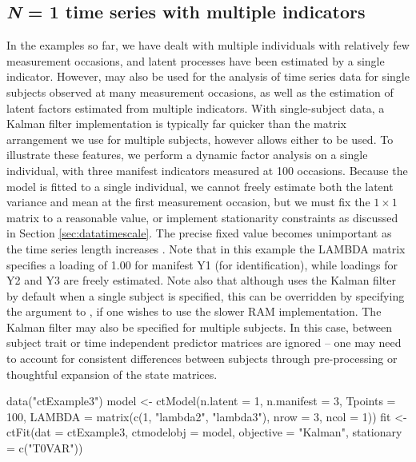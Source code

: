 \documentclass[nojss]{jss}\usepackage[]{graphicx}\usepackage[]{color}
\begin{document}
\subsection[N = 1 Time series with multiple indicators]{\textit{N} = 1 time series with multiple indicators} \label{sec:timeseries}
In the examples so far, we have dealt with multiple individuals with relatively few measurement occasions, and latent processes have been estimated by a single indicator. However,  may also be used for the analysis of time series data for single subjects observed at many measurement occasions, as well as the estimation of latent factors estimated from multiple indicators. With single-subject data, a Kalman filter implementation is typically far quicker than the matrix arrangement we use for multiple subjects, however  allows either to be used.  To illustrate these features, we perform a dynamic factor analysis on a single individual, with three manifest indicators measured at 100 occasions. Because the model is fitted to a single individual, we cannot freely estimate both the latent variance and mean at the first measurement occasion, but we must fix the $1 \times 1$  matrix to a reasonable value, or implement stationarity constraints as discussed in Section \ref{sec:datatimescale}. The precise fixed value becomes unimportant as the time series length increases \citep{durbin2012time}. Note that in this example the LAMBDA matrix specifies a loading of 1.00 for manifest Y1 (for identification), while loadings for Y2 and Y3 are freely estimated. Note also that although  uses the Kalman filter by default when a single subject is specified, this can be overridden by specifying the  argument to , if one wishes to use the slower RAM implementation. The Kalman filter may also be specified for multiple subjects. In this case, between subject trait or time independent predictor matrices are ignored -- one may need to account for consistent differences between subjects through pre-processing or thoughtful expansion of the state matrices.

\begin{Schunk}
\begin{Sinput}
data("ctExample3")
model <- ctModel(n.latent = 1, n.manifest = 3, Tpoints = 100, 
  LAMBDA = matrix(c(1, "lambda2", "lambda3"), nrow = 3, ncol = 1))
fit <- ctFit(dat = ctExample3, ctmodelobj = model, objective = "Kalman",
  stationary = c("T0VAR"))
\end{Sinput}
\end{Schunk}
\end{document}
